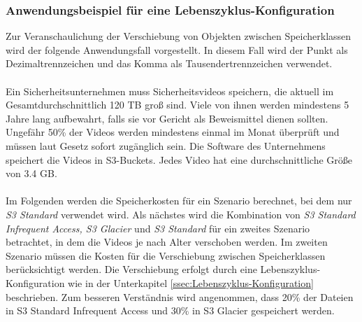 \subsubsection{Anwendungsbeispiel für eine Lebenszyklus-Konfiguration}
Zur Veranschaulichung der Verschiebung von Objekten zwischen Speicherklassen wird der folgende Anwendungsfall vorgestellt. In diesem Fall wird der Punkt als Dezimaltrennzeichen und das Komma als Tausendertrennzeichen verwendet. 
\\\\
Ein Sicherheitsunternehmen muss Sicherheitsvideos speichern, die aktuell im Gesamtdurchschnittlich 120 TB groß sind. Viele von ihnen werden mindestens 5 Jahre lang aufbewahrt, falls sie vor Gericht als Beweismittel dienen sollten. Ungefähr 50\% der Videos werden mindestens einmal im Monat überprüft und müssen laut Gesetz sofort zugänglich sein. Die Software des Unternehmens speichert die Videos in S3-Buckets. Jedes Video hat eine durchschnittliche Größe von 3.4 GB.
\\\\
Im Folgenden werden die Speicherkosten für ein Szenario berechnet, bei dem nur \textit{S3 Standard} verwendet wird. Als nächstes wird die Kombination von \textit{S3 Standard Infrequent Access, S3 Glacier} und \textit{S3 Standard} für ein zweites Szenario betrachtet, in dem die Videos je nach Alter verschoben werden. Im zweiten Szenario müssen die Kosten für die Verschiebung zwischen Speicherklassen berücksichtigt werden. Die Verschiebung erfolgt durch eine Lebenszyklus-Konfiguration wie in der Unterkapitel \ref{ssec:Lebenszyklus-Konfiguration} beschrieben. Zum besseren Verständnis wird angenommen, dass 20\% der Dateien in S3 Standard Infrequent Access und 30\% in S3 Glacier gespeichert werden.
\newpage

